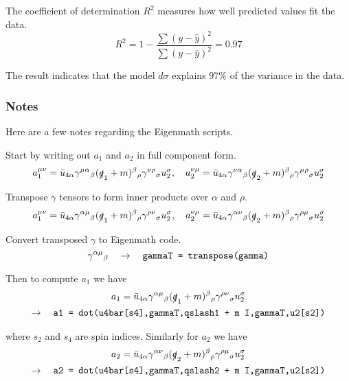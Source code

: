 The coefficient of determination $R^2$ measures how well predicted values fit the data.
\begin{equation*}
R^2=1-\frac{\sum(y-\hat{y})^2}{\sum(y-\bar{y})^2}=0.97
\end{equation*}

The result indicates that the model $d\sigma$ explains 97\% of the variance in the data.

\fi

\iffalse
\subsubsection*{Notes}
Here are a few notes regarding the Eigenmath scripts.

\bigskip
Start by writing out $a_1$ and $a_2$ in full component form.
\begin{equation*}
a_1^{\mu\nu}
=\bar{u}_{4\alpha}\gamma^{\mu\alpha}{}_\beta(\slashed{q}_1+m)^\beta{}_\rho\gamma^{\nu\rho}{}_\sigma u_2^\sigma,
\quad
a_2^{\nu\mu}
=\bar{u}_{4\alpha}\gamma^{\nu\alpha}{}_\beta(\slashed{q}_2+m)^\beta{}_\rho\gamma^{\mu\rho}{}_\sigma u_2^\sigma
\end{equation*}

Transpose $\gamma$ tensors to form inner products over $\alpha$ and $\rho$.
\begin{equation*}
a_1^{\mu\nu}
=\bar{u}_{4\alpha}\gamma^{\alpha\mu}{}_\beta(\slashed{q}_1+m)^\beta{}_\rho\gamma^{\rho\nu}{}_\sigma u_2^\sigma,
\quad
a_2^{\nu\mu}
=\bar{u}_{4\alpha}\gamma^{\alpha\nu}{}_\beta(\slashed{q}_2+m)^\beta{}_\rho\gamma^{\rho\mu}{}_\sigma u_2^\sigma
\end{equation*}

Convert transposed $\gamma$ to Eigenmath code.
\begin{equation*}
\gamma^{\alpha\mu}{}_\beta
\quad\rightarrow\quad
\text{\tt gammaT = transpose(gamma)}
\end{equation*}

Then to compute $a_1$ we have
\begin{multline*}
a_1=\bar{u}_{4\alpha}\gamma^{\alpha\mu}{}_\beta(\slashed{q}_1+m)^\beta{}_\rho\gamma^{\rho\nu}{}_\sigma u_2^\sigma
\\
\rightarrow\quad
\text{\tt a1 = dot(u4bar[s4],gammaT,qslash1 + m I,gammaT,u2[s2])}
\end{multline*}

where $s_2$ and $s_4$ are spin indices.
Similarly for $a_2$ we have
\begin{multline*}
a_2=\bar{u}_{4\alpha}\gamma^{\alpha\nu}{}_\beta(\slashed{q}_2+m)^\beta{}_\rho\gamma^{\rho\mu}{}_\sigma u_2^\sigma
\\
\rightarrow\quad
\text{\tt a2 = dot(u4bar[s4],gammaT,qslash2 + m I,gammaT,u2[s2])}
\end{multline*}

